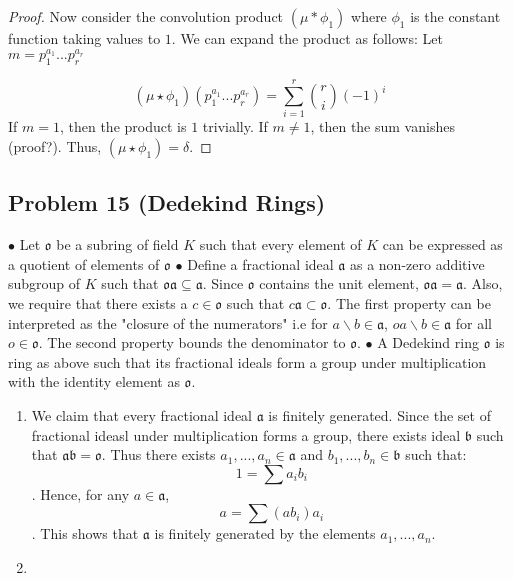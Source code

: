 \documentclass[Lang.tex]{subfiles}
\begin{document}
\begin{enumerate}
\begin{proof}
			Now consider the convolution product $ (\mu * \phi_1) $ where $\phi_1$ is the constant function taking values to $1$. We can expand the product as follows: Let $m = p_1^{a_1}...p_r^{a_r}$
			
			$$ (\mu \star \phi_1)(p_1^{a_1}...p_r^{a_r}) = \sum_{i = 1}^r {r \choose i} (-1)^i $$  If $m = 1$, then the product is $1$ trivially. If $m \neq 1$, then the sum vanishes (proof?). Thus, $(\mu \star \phi_1) = \delta$. 
		\end{proof}
	\end{enumerate}
	
	\subsection*{Problem 15 (Dedekind Rings)}
		$\bullet$ Let $\mathfrak{o}$ be a subring of field $K$ such that every element of $K$ can be expressed as a quotient of elements of $\mathfrak{o}$ \newline 
		$\bullet$ Define a fractional ideal $\mathfrak{a}$ as a non-zero additive subgroup of $K$ such that $\mathfrak{o}\mathfrak{a} \subseteq \mathfrak{a}$. Since $\mathfrak{o}$ contains the unit element, $\mathfrak{o}\mathfrak{a} = \mathfrak{a}$. Also, we require that there exists a $c \in \mathfrak{o}$ such that $c\mathfrak{a} \subset \mathfrak{o}$. The first property can be interpreted as the "closure of the numerators" i.e for $a \backslash b \in \mathfrak{a} $, $oa \backslash b \in \mathfrak{a}$ for all $o \in \mathfrak{o}$. The second property bounds the denominator to $\mathfrak{o}$. \newline
		$\bullet$ A Dedekind ring  $\mathfrak{o}$ is ring as above such that its fractional ideals form a group under multiplication with the identity element as $\mathfrak{o}$. 
		
		\begin{enumerate}
			\item We claim that every fractional ideal $\mathfrak{a}$ is finitely generated. Since the set of fractional ideasl under multiplication forms a group, there exists ideal $\mathfrak{b}$ such that $\mathfrak{a}\mathfrak{b} = \mathfrak{o}$. Thus there exists $a_1,...,a_n \in \mathfrak{a}$ and $b_1,...,b_n \in \mathfrak{b}$ such that:
			$$ 1 = \sum a_ib_i$$. Hence, for any $a \in \mathfrak{a}$, 
			$$ a = \sum (ab_i)a_i $$. This shows that $\mathfrak{a}$ is finitely generated by the elements $a_1,...,a_n$.
			\item 
		\end{enumerate}
\end{document}
